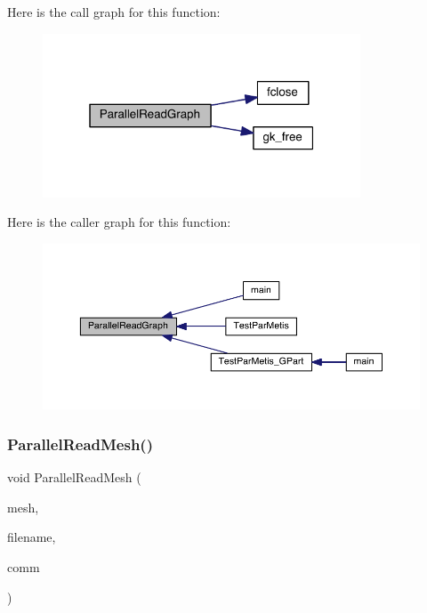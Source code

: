 Here is the call graph for this function\+:\nopagebreak
\begin{figure}[H]
\begin{center}
\leavevmode
\includegraphics[width=268pt]{a00861_abcd3804c62bf4464f2c8de37a42e6ef8_cgraph}
\end{center}
\end{figure}
Here is the caller graph for this function\+:\nopagebreak
\begin{figure}[H]
\begin{center}
\leavevmode
\includegraphics[width=350pt]{a00861_abcd3804c62bf4464f2c8de37a42e6ef8_icgraph}
\end{center}
\end{figure}
\mbox{\label{a00861_a2c53ca97c8a99924f3bbaa8fbd050b8c}} 
\subsubsection{\texorpdfstring{Parallel\+Read\+Mesh()}{ParallelReadMesh()}}
{\footnotesize\ttfamily void Parallel\+Read\+Mesh (\begin{DoxyParamCaption}\item[{\hyperlink{a00738}{mesh\+\_\+t} $\ast$}]{mesh,  }\item[{char $\ast$}]{filename,  }\item[{M\+P\+I\+\_\+\+Comm}]{comm }\end{DoxyParamCaption})}

